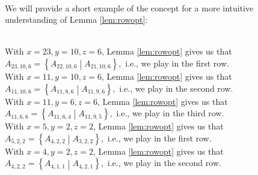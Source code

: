 ~\\
We will provide a short example of the concept for a more intuitive understanding of Lemma \ref{lem:rowopt}:
\begin{ex}{}~\\
With $x=23,y=10,z=6$, Lemma \ref{lem:rowopt} gives us that $A_{23,10,6}=\left\{A_{22,10,6}\middle| A_{21,10,6}\right\},$ i.e., we play in the first row.
\\
With $x=11,y=10,z=6$, Lemma \ref{lem:rowopt} gives us that $A_{11,10,6}=\left\{A_{11,8,6}\middle| A_{11,9,6}\right\},$ i.e., we play in the second row.
\\
With $x=11,y=6,z=6$, Lemma \ref{lem:rowopt} gives us that $A_{11,6,6}=\left\{A_{11,6,4}\middle| A_{11,9,5}\right\},$ i.e., we play in the third row.
\\
With $x=5,y=2,z=2$, Lemma \ref{lem:rowopt} gives us that $A_{5,2,2}=\left\{A_{4,2,2}\middle| A_{3,2,2}\right\},$ i.e., we play in the first row.
\\
With $x=4,y=2,z=2$, Lemma \ref{lem:rowopt} gives us that $A_{4,2,2}=\left\{A_{4,1,1}\middle| A_{4,2,1}\right\},$ i.e., we play in the second row.
\end{ex}
